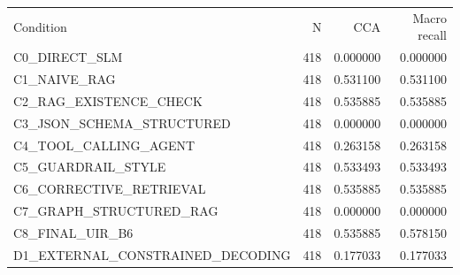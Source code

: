 \begin{tabular}{lrrr}
Condition & N & CCA & Macro recall \\
C0\_DIRECT\_SLM & 418 & 0.000000 & 0.000000 \\
C1\_NAIVE\_RAG & 418 & 0.531100 & 0.531100 \\
C2\_RAG\_EXISTENCE\_CHECK & 418 & 0.535885 & 0.535885 \\
C3\_JSON\_SCHEMA\_STRUCTURED & 418 & 0.000000 & 0.000000 \\
C4\_TOOL\_CALLING\_AGENT & 418 & 0.263158 & 0.263158 \\
C5\_GUARDRAIL\_STYLE & 418 & 0.533493 & 0.533493 \\
C6\_CORRECTIVE\_RETRIEVAL & 418 & 0.535885 & 0.535885 \\
C7\_GRAPH\_STRUCTURED\_RAG & 418 & 0.000000 & 0.000000 \\
C8\_FINAL\_UIR\_B6 & 418 & 0.535885 & 0.578150 \\
D1\_EXTERNAL\_CONSTRAINED\_DECODING & 418 & 0.177033 & 0.177033 \\
\end{tabular}
